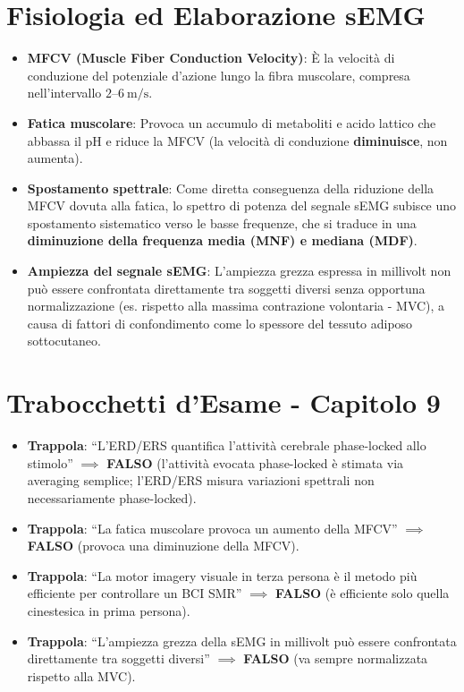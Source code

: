\documentclass[10pt, letterpaper]{report}
\begin{document}
\section{Fisiologia ed Elaborazione sEMG}
\begin{itemize}
    \item \textbf{MFCV (Muscle Fiber Conduction Velocity)}: È la velocità di conduzione del potenziale d'azione lungo la fibra muscolare, compresa nell'intervallo \textbf{\(2\text{--}6\ \text{m/s}\)}.
    \item \textbf{Fatica muscolare}: Provoca un accumulo di metaboliti e acido lattico che abbassa il pH e riduce la MFCV (la velocità di conduzione \textbf{diminuisce}, non aumenta).
    \item \textbf{Spostamento spettrale}: Come diretta conseguenza della riduzione della MFCV dovuta alla fatica, lo spettro di potenza del segnale sEMG subisce uno spostamento sistematico verso le basse frequenze, che si traduce in una \textbf{diminuzione della frequenza media (MNF) e mediana (MDF)}.
    \item \textbf{Ampiezza del segnale sEMG}: L'ampiezza grezza espressa in millivolt non può essere confrontata direttamente tra soggetti diversi senza opportuna normalizzazione (es. rispetto alla massima contrazione volontaria - MVC), a causa di fattori di confondimento come lo spessore del tessuto adiposo sottocutaneo.
\end{itemize}

\section*{Trabocchetti d'Esame - Capitolo 9}
\begin{itemize}
    \item \textbf{Trappola}: ``L'ERD/ERS quantifica l'attività cerebrale phase-locked allo stimolo'' \(\implies\) \textbf{FALSO} (l'attività evocata phase-locked è stimata via averaging semplice; l'ERD/ERS misura variazioni spettrali non necessariamente phase-locked).
    \item \textbf{Trappola}: ``La fatica muscolare provoca un aumento della MFCV'' \(\implies\) \textbf{FALSO} (provoca una diminuzione della MFCV).
    \item \textbf{Trappola}: ``La motor imagery visuale in terza persona è il metodo più efficiente per controllare un BCI SMR'' \(\implies\) \textbf{FALSO} (è efficiente solo quella cinestesica in prima persona).
    \item \textbf{Trappola}: ``L'ampiezza grezza della sEMG in millivolt può essere confrontata direttamente tra soggetti diversi'' \(\implies\) \textbf{FALSO} (va sempre normalizzata rispetto alla MVC).
\end{itemize}
\end{document}
